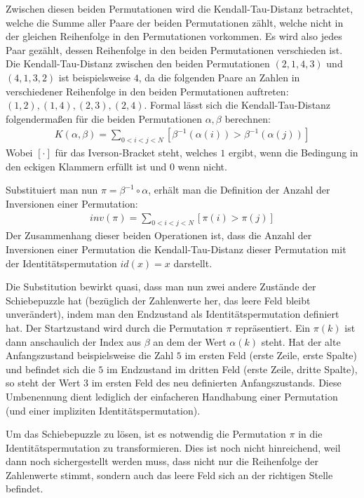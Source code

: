\documentclass{whswinvcbook}
\begin{document}
Zwischen diesen beiden Permutationen wird die Kendall-Tau-Distanz betrachtet, welche die Summe aller Paare der beiden Permutationen zählt, welche nicht in der gleichen Reihenfolge in den Permutationen vorkommen. Es wird also jedes Paar gezählt, dessen Reihenfolge in den beiden Permutationen verschieden ist. Die Kendall-Tau-Distanz zwischen den beiden Permutationen $(2,1,4,3)$ und $(4,1,3,2)$ ist beispielsweise $4$, da die folgenden Paare an Zahlen in verschiedener Reihenfolge in den beiden Permutationen auftreten: $(1,2),(1,4),(2,3),(2,4)$. Formal lässt sich die Kendall-Tau-Distanz folgendermaßen für die beiden Permutationen $\alpha,\beta$ berechnen:\cite{sedge}
\begin{align}\label{eq-kendall}
    K(\alpha,\beta)=\sum_{0<i<j<N}\left[\beta^{-1}\left(\alpha\left(i\right)\right)>\beta^{-1}\left(\alpha\left(j\right)\right)\right]
\end{align}
Wobei $[\cdot]$ für das Iverson-Bracket steht, welches $1$ ergibt, wenn die Bedingung in den eckigen Klammern erfüllt ist und $0$ wenn nicht.

Substituiert man nun $\pi=\beta^{-1}\circ\alpha$, erhält man die Definition der Anzahl der Inversionen einer Permutation:\cite{inv}
\begin{align}\label{eq-inv}
    inv(\pi)=\sum_{0<i<j<N}[\pi(i)>\pi(j)]
\end{align}
Der Zusammenhang dieser beiden Operationen ist, dass die Anzahl der Inversionen einer Permutation die Kendall-Tau-Distanz dieser Permutation mit der Identitätspermutation $id(x)=x$ darstellt.

Die Substitution bewirkt quasi, dass man nun zwei andere Zustände der Schiebepuzzle hat (bezüglich der Zahlenwerte her, das leere Feld bleibt unverändert), indem man den Endzustand als Identitätspermutation definiert hat. Der Startzustand wird durch die Permutation $\pi$ repräsentiert. Ein $\pi(k)$ ist dann anschaulich der Index aus $\beta$ an dem der Wert $\alpha(k)$ steht. Hat der alte Anfangszustand beispielsweise die Zahl $5$ im ersten Feld (erste Zeile, erste Spalte) und befindet sich die $5$ im Endzustand im dritten Feld (erste Zeile, dritte Spalte), so steht der Wert $3$ im ersten Feld des neu definierten Anfangszustands. Diese Umbenennung dient lediglich der einfacheren Handhabung einer Permutation (und einer impliziten Identitätspermutation).

Um das Schiebepuzzle zu lösen, ist es notwendig die Permutation $\pi$ in die Identitätspermutation zu transformieren. Dies ist noch nicht hinreichend, weil dann noch sichergestellt werden muss, dass nicht nur die Reihenfolge der Zahlenwerte stimmt, sondern auch das leere Feld sich an der richtigen Stelle befindet.
\end{document}
